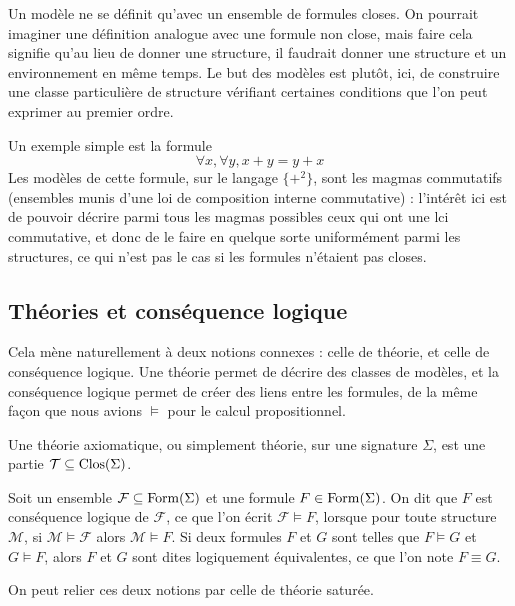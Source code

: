 Un modèle ne se définit qu'avec un ensemble de formules closes. On pourrait
imaginer une définition analogue avec une formule non close, mais faire cela
signifie qu'au lieu de donner une structure, il faudrait donner une structure et
un environnement en même temps. Le but des modèles est plutôt, ici, de
construire une classe particulière de structure vérifiant certaines conditions
que l'on peut exprimer au premier ordre.

Un exemple simple est la formule
\[\forall x,\forall y, x + y = y + x\]
Les modèles de cette formule, sur le langage $\{+^2\}$, sont les magmas
commutatifs (ensembles munis d'une loi de composition interne commutative) :
l'intérêt ici est de pouvoir décrire parmi tous les magmas possibles ceux qui
ont une lci commutative, et donc de le faire en quelque sorte uniformément parmi
les structures, ce qui n'est pas le cas si les formules n'étaient pas closes.

\subsection{Théories et conséquence logique}

Cela mène naturellement à deux notions connexes : celle de théorie, et celle
de conséquence logique. Une théorie permet de décrire des classes de modèles, et
la conséquence logique permet de créer des liens entre les formules, de la même
façon que nous avions $\vDash$ pour le calcul propositionnel.

\begin{definition}[Théorie]
  Une théorie axiomatique, ou simplement théorie, sur une signature $\Sigma$,
  est une partie $\mathcal T\subseteq\operatorname{Clos}(\Sigma)$.
\end{definition}

\begin{definition}
  Soit un ensemble $\mathcal F \subseteq \operatorname{Form}(\Sigma)$ et une formule
  $F\in\operatorname{Form}(\Sigma)$. On dit que $F$ est conséquence logique de
  $\mathcal F$, ce que l'on écrit $\mathcal F \vDash F$, lorsque pour toute
  structure $\mathcal M$, si $\mathcal M\models \mathcal F$ alors
  $\mathcal M\models F$. Si deux formules $F$ et $G$ sont telles que
  $F\vDash G$ et $G\vDash F$, alors $F$ et $G$ sont dites logiquement
  équivalentes, ce que l'on note $F\equiv G$.
\end{definition}

On peut relier ces deux notions par celle de théorie saturée.

